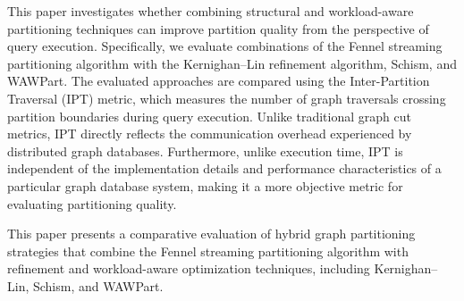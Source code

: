 This paper investigates whether combining structural and workload-aware partitioning techniques can improve partition quality from the perspective of query execution. Specifically, we evaluate combinations of the Fennel streaming partitioning algorithm with the Kernighan--Lin refinement algorithm, Schism, and WAWPart. The evaluated approaches are compared using the Inter-Partition Traversal (IPT) metric, which measures the number of graph traversals crossing partition boundaries during query execution. Unlike traditional graph cut metrics, IPT directly reflects the communication overhead experienced by distributed graph databases. Furthermore, unlike execution time, IPT is independent of the implementation details and performance characteristics of a particular graph database system, making it a more objective metric for evaluating partitioning quality.

This paper presents a comparative evaluation of hybrid graph partitioning strategies that combine the Fennel streaming partitioning algorithm with refinement and workload-aware optimization techniques, including Kernighan--Lin, Schism, and WAWPart.

